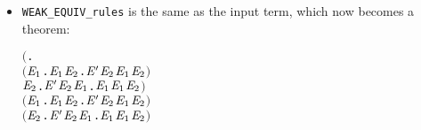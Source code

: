 \begin{itemize}
\item \texttt{WEAK_EQUIV_rules} is the same as the input term, which now becomes a theorem:
\begin{alltt}
\HOLTokenTurnstile{} \ensuremath{(}\HOLSymConst{\HOLTokenForall{}}.
        \ensuremath{(}\HOLSymConst{\HOLTokenForall{}}\ensuremath{\HOLBoundVar{E}\sb{\mathrm{1}}}.  \HOLTokenTransBegin{} \HOLTokenTransEnd \ensuremath{\HOLBoundVar{E}\sb{\mathrm{1}}} \HOLSymConst{\HOLTokenImp{}} \HOLSymConst{\HOLTokenExists{}}\ensuremath{\HOLBoundVar{E}\sb{\mathrm{2}}}. \ensuremath{\HOLFreeVar{E}\sp{\prime}} \HOLTokenWeakTransBegin{} \HOLTokenWeakTransEnd \ensuremath{\HOLBoundVar{E}\sb{\mathrm{2}}} \HOLSymConst{\HOLTokenConj{}} \ensuremath{\HOLBoundVar{E}\sb{\mathrm{1}}} \HOLSymConst{\HOLTokenWeakEQ} \ensuremath{\HOLBoundVar{E}\sb{\mathrm{2}}}\ensuremath{)} \HOLSymConst{\HOLTokenConj{}}
        \HOLSymConst{\HOLTokenForall{}}\ensuremath{\HOLBoundVar{E}\sb{\mathrm{2}}}. \ensuremath{\HOLFreeVar{E}\sp{\prime}} \HOLTokenTransBegin{} \HOLTokenTransEnd \ensuremath{\HOLBoundVar{E}\sb{\mathrm{2}}} \HOLSymConst{\HOLTokenImp{}} \HOLSymConst{\HOLTokenExists{}}\ensuremath{\HOLBoundVar{E}\sb{\mathrm{1}}}.  \HOLTokenWeakTransBegin{} \HOLTokenWeakTransEnd \ensuremath{\HOLBoundVar{E}\sb{\mathrm{1}}} \HOLSymConst{\HOLTokenConj{}} \ensuremath{\HOLBoundVar{E}\sb{\mathrm{1}}} \HOLSymConst{\HOLTokenWeakEQ} \ensuremath{\HOLBoundVar{E}\sb{\mathrm{2}}}\ensuremath{)} \HOLSymConst{\HOLTokenConj{}}
   \ensuremath{(}\HOLSymConst{\HOLTokenForall{}}\ensuremath{\HOLBoundVar{E}\sb{\mathrm{1}}}.  \HOLTokenTransBegin\HOLSymConst{\ensuremath{\tau}}\HOLTokenTransEnd \ensuremath{\HOLBoundVar{E}\sb{\mathrm{1}}} \HOLSymConst{\HOLTokenImp{}} \HOLSymConst{\HOLTokenExists{}}\ensuremath{\HOLBoundVar{E}\sb{\mathrm{2}}}. \ensuremath{\HOLFreeVar{E}\sp{\prime}} \HOLSymConst{\HOLTokenEPS} \ensuremath{\HOLBoundVar{E}\sb{\mathrm{2}}} \HOLSymConst{\HOLTokenConj{}} \ensuremath{\HOLBoundVar{E}\sb{\mathrm{1}}} \HOLSymConst{\HOLTokenWeakEQ} \ensuremath{\HOLBoundVar{E}\sb{\mathrm{2}}}\ensuremath{)} \HOLSymConst{\HOLTokenConj{}}
   \ensuremath{(}\HOLSymConst{\HOLTokenForall{}}\ensuremath{\HOLBoundVar{E}\sb{\mathrm{2}}}. \ensuremath{\HOLFreeVar{E}\sp{\prime}} \HOLTokenTransBegin\HOLSymConst{\ensuremath{\tau}}\HOLTokenTransEnd \ensuremath{\HOLBoundVar{E}\sb{\mathrm{2}}} \HOLSymConst{\HOLTokenImp{}} \HOLSymConst{\HOLTokenExists{}}\ensuremath{\HOLBoundVar{E}\sb{\mathrm{1}}}.  \HOLSymConst{\HOLTokenEPS} \ensuremath{\HOLBoundVar{E}\sb{\mathrm{1}}} \HOLSymConst{\HOLTokenConj{}} \ensuremath{\HOLBoundVar{E}\sb{\mathrm{1}}} \HOLSymConst{\HOLTokenWeakEQ} \ensuremath{\HOLBoundVar{E}\sb{\mathrm{2}}}\ensuremath{)} \HOLSymConst{\HOLTokenImp{}}

\end{alltt}
\end{itemize}
